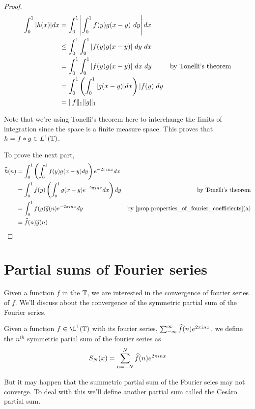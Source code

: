   \begin{proof}
    \begin{align*}
  \int_{0}^{1} |h(x)| dx &= \int_{0}^{1} \left| \int_{0}^{1} f(y)g(x-y)\  dy \right| dx \\
                         &\le \int_{0}^{1} \int_{0}^{1} |f(y)g(x-y)| \ dy \ dx \\
                         &= \int_{0}^{1} \int_{0}^{1} |f(y)g(x-y)| \ dx \ dy & \text{by Tonelli's theorem}\\
                         &= \int_{0}^{1} \left( \int_{0}^{1} |g(x-y)| dx \right) |f(y)|dy \\
                         &=\norm{f}_1 \norm{g}_1
    \end{align*}

    Note that we're using Tonelli's theorem here to interchange the limits of integration since the space is a finite measure space. This proves that $h = f*g \in L^1(\mathbb T)$.

    To prove the next part,
    \begin{align*}
      \hath(n) &= \int_0^1 \left( \int_0^1 f(y)g(x-y)dy \right) e^{-2\pi in x} dx \\
               &= \int_0^1 f(y) \left( \int_0^1 g(x-y) e^{-2\pi in x}dx \right) dy & \text{by Tonelli's theorem}\\  
               &= \int_0^1 f(y) \hatg(n)e^{-2\pi inx} dy & \text{by \autoref{prop:properties_of_fourier_coefficients}(a)}\\
               &= \hatf(n)\hatg(n)
    \end{align*}
  \end{proof}
 

  \section{Partial sums of Fourier series}
  Given a function $f$ in the $\mathbb T$, we are interested in the convergence of fourier series of $f$. We'll discuss about the convergence of the symmetric partial sum of the Fourier series.

  \begin{definition}
    \label{def:symmetric_partial_sum_of_fourier_series}
    Given a function $f \in \L^1(\T)$ with its fourier series, $\sum_{-\infty}^\infty \widehat{f}(n)e^{2\pi in x}$, we define the $n^{th}$ symmetric parial sum of the fourier series as
    \begin{displaymath}
      S_N(x) = \sum_{n=-N}^N \widehat{f}(n)e^{2\pi inx}
    \end{displaymath}
  \end{definition}
  But it may happen that the summetric partial sum of the Fourier seies may not converge. To deal with this we'll define another partial sum called the Ces\'aro partial sum.

